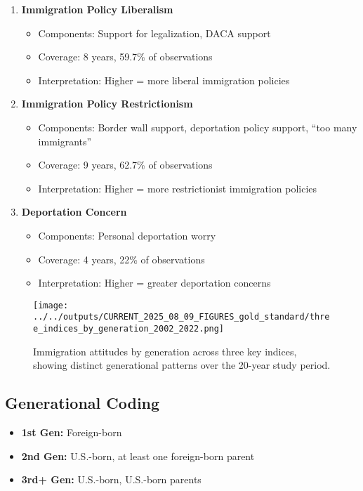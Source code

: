 \documentclass[11pt,letterpaper]{article}
\newcommand{\compactdesc}[2]{\item \textbf{#1:} #2}
\begin{document}
\begin{enumerate}
    \item \textbf{Immigration Policy Liberalism}
        \begin{itemize}
            \item Components: Support for legalization, DACA support
            \item Coverage: 8 years, 59.7\% of observations
            \item Interpretation: Higher = more liberal immigration policies
        \end{itemize}
        
    \item \textbf{Immigration Policy Restrictionism}
        \begin{itemize}
            \item Components: Border wall support, deportation policy support, ``too many immigrants''
            \item Coverage: 9 years, 62.7\% of observations
            \item Interpretation: Higher = more restrictionist immigration policies
        \end{itemize}
        
    \item \textbf{Deportation Concern}
        \begin{itemize}
            \item Components: Personal deportation worry
            \item Coverage: 4 years, 22\% of observations
            \item Interpretation: Higher = greater deportation concerns
        \end{itemize}
\end{enumerate}

\begin{figure}[H]
    \centering
    \texttt{[image: ../../outputs/CURRENT\_2025\_08\_09\_FIGURES\_gold\_standard/three\_indices\_by\_generation\_2002\_2022.png]}
    \caption{Immigration attitudes by generation across three key indices, showing distinct generational patterns over the 20-year study period.}
    \label{fig:three_indices}
\end{figure}

\subsection{Generational Coding}
\begin{itemize}
    \compactdesc{1st Gen}{Foreign-born}
    \compactdesc{2nd Gen}{U.S.-born, at least one foreign-born parent}
    \compactdesc{3rd+ Gen}{U.S.-born, U.S.-born parents}
\end{itemize}
\end{document}
